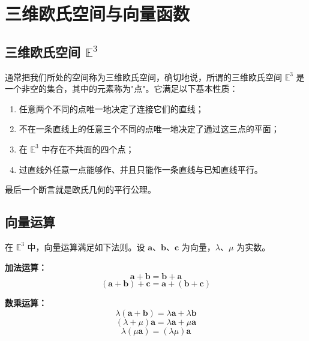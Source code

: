 
\section{三维欧氏空间与向量函数}

\subsection{三维欧氏空间 $\mathbb{E}^3$}

通常把我们所处的空间称为三维欧氏空间，确切地说，所谓的三维欧氏空间 $\mathbb{E}^3$ 是一个非空的集合，其中的元素称为"点"。它满足以下基本性质：
\begin{enumerate}
	\item 任意两个不同的点唯一地决定了连接它们的直线；
	\item 不在一条直线上的任意三个不同的点唯一地决定了通过这三点的平面；
	\item 在 $\mathbb{E}^3$ 中存在不共面的四个点；
	\item 过直线外任意一点能够作、并且只能作一条直线与已知直线平行。
\end{enumerate}

最后一个断言就是欧氏几何的平行公理。

\subsection{向量运算}

在 $\mathbb{E}^3$ 中，向量运算满足如下法则。设 $\boldsymbol{a}$、$\boldsymbol{b}$、$\boldsymbol{c}$ 为向量，$\lambda$、$\mu$ 为实数。

\textbf{加法运算：}
\begin{equation}
	\boldsymbol{a}+\boldsymbol{b}=\boldsymbol{b}+\boldsymbol{a}
	\label{eq:向量运算:加法交换律}
\end{equation}
\begin{equation}
	(\boldsymbol{a}+\boldsymbol{b})+\boldsymbol{c}=\boldsymbol{a}+(\boldsymbol{b}+\boldsymbol{c})
	\label{eq:向量运算:加法结合律}
\end{equation}

\textbf{数乘运算：}
\begin{equation}
	\lambda(\boldsymbol{a}+\boldsymbol{b})=\lambda\boldsymbol{a}+\lambda\boldsymbol{b}
	\label{eq:向量运算:数乘分配率1}
\end{equation}
\begin{equation}
	(\lambda+\mu)\boldsymbol{a}=\lambda\boldsymbol{a}+\mu\boldsymbol{a}
	\label{eq:向量运算:数乘分配率2}
\end{equation}
\begin{equation}
	\lambda(\mu\boldsymbol{a})=(\lambda\mu)\boldsymbol{a}
	\label{eq:向量运算:数乘结合律}
\end{equation}

